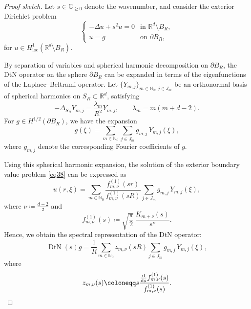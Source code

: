 \documentclass[12pt,reqno]{amsart}
\numberwithin{equation}{section}
\begin{document}
\begin{proof}[Proof sketch]

Let $s \in \mathbb{C}_{\ge 0}$ denote the wavenumber, and consider the exterior Dirichlet problem
\begin{equation}\label{eq38}
\begin{cases}
    -\Delta u + s^2 u = 0 & \text{in } \mathbb{R}^d \setminus B_R,\\
    u = g & \text{on } \partial B_R,
\end{cases}
\end{equation}
for $u \in H^1_{\mathrm{loc}}(\mathbb{R}^d \setminus B_R)$.

By separation of variables and spherical harmonic decomposition on $\partial B_R$, the DtN operator on the sphere $\partial B_R$ can be expanded in terms of the eigenfunctions of the Laplace–Beltrami operator. Let $\{Y_{m,j}\}_{m\in\mathbb{N}_0, \, j\in J_m}$ be an orthonormal basis of spherical harmonics on $S_R \subset \mathbb{R}^d$, satisfying
\begin{equation*}
    -\Delta_{S_R} Y_{m,j} = \frac{\lambda_m}{R^2} Y_{m,j}, \qquad \lambda_m = m(m+d-2).
\end{equation*}
For $g \in H^{1/2}(\partial B_R)$, we have the expansion
\begin{equation*}
    g(\xi) = \sum_{m\in\mathbb{N}_0} \sum_{j\in J_m} g_{m,j} \, Y_{m,j}(\xi),
\end{equation*}
where $g_{m,j}$ denote the corresponding Fourier coefficients of $g$.

Using this spherical harmonic expansion, the solution of the exterior boundary value problem \eqref{eq38} can be expressed as
\begin{equation*}
    u(r,\xi) = \sum_{m\in\mathbb{N}_0} \frac{f^{(1)}_{m,\nu}(sr)}{f^{(1)}_{m,\nu}(sR)} \sum_{j\in J_m} g_{m,j} \, Y_{m,j}(\xi),
\end{equation*}
where $\nu \coloneqq \frac{d-2}{2}$ and
\begin{equation*}
    f^{(1)}_{m,\nu}(s) \coloneqq \sqrt{\frac{\pi}{2}} \, \frac{K_{m+\nu}(s)}{s^\nu}.
\end{equation*}
Hence, we obtain the spectral representation of the DtN operator:
\begin{equation*}
    \operatorname{DtN}(s)g = \frac{1}{R} \sum_{m\in\mathbb{N}_0} z_{m,\nu}(sR) \sum_{j\in J_m} g_{m,j} \, Y_{m,j}(\xi),
\end{equation*}
where
\begin{equation*}
    z_{m,\nu}(s) \coloneqq s \frac{\frac{{\rm d}}{{\rm d}s} f^{(1)}_{m,\nu}(s)}{f^{(1)}_{m,\nu}(s)}.
\end{equation*}


\end{proof}
\end{document}
